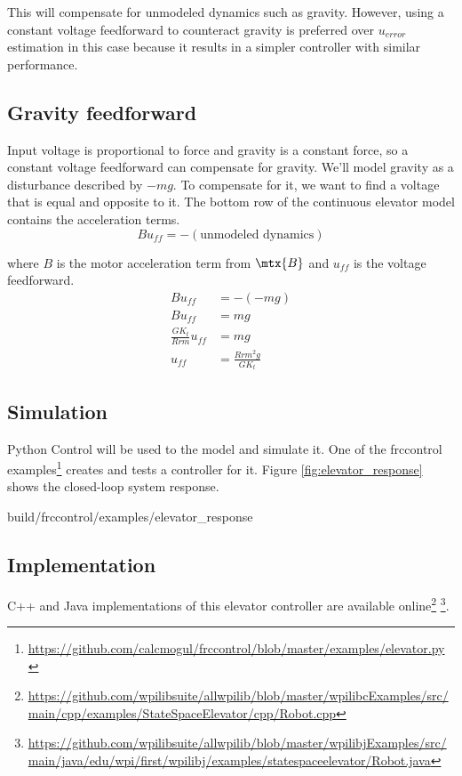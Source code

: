 This will compensate for unmodeled dynamics such as gravity. However, using a
constant voltage feedforward to counteract gravity is preferred over $u_{error}$
estimation in this case because it results in a simpler controller with similar
performance.

\subsection{Gravity feedforward}

Input voltage is proportional to force and gravity is a constant force, so a
constant voltage feedforward can compensate for gravity. We'll model gravity as
a disturbance described by $-mg$. To compensate for it, we want to find a
voltage that is equal and opposite to it. The bottom row of the continuous
elevator model contains the acceleration terms.
\begin{equation*}
  Bu_{ff} = -(\text{unmodeled dynamics})
\end{equation*}

where $B$ is the motor acceleration term from $\mtx{B}$ and $u_{ff}$ is the
voltage feedforward.
\begin{align*}
  Bu_{ff} &= -(-mg) \\
  Bu_{ff} &= mg \\
  \frac{G K_t}{Rrm} u_{ff} &= mg \\
  u_{ff} &= \frac{Rrm^2 g}{G K_t}
\end{align*}

\subsection{Simulation}

Python Control will be used to  the
\gls{model} and simulate it. One of the frccontrol
examples\footnote{\url{https://github.com/calcmogul/frccontrol/blob/master/examples/elevator.py}}
creates and tests a controller for it. Figure \ref{fig:elevator_response} shows
the closed-loop \gls{system} response.
\begin{svg}{build/frccontrol/examples/elevator_response}
  \caption{Elevator response}
  \label{fig:elevator_response}
\end{svg}

\subsection{Implementation}

C++ and Java implementations of this elevator controller are available
online\footnote{\url{https://github.com/wpilibsuite/allwpilib/blob/master/wpilibcExamples/src/main/cpp/examples/StateSpaceElevator/cpp/Robot.cpp}}
\footnote{\url{https://github.com/wpilibsuite/allwpilib/blob/master/wpilibjExamples/src/main/java/edu/wpi/first/wpilibj/examples/statespaceelevator/Robot.java}}.
